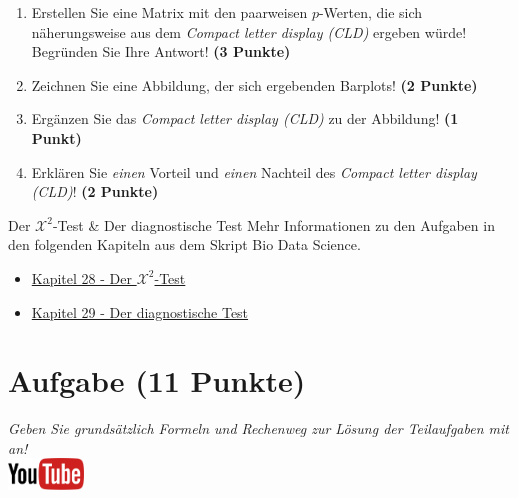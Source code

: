 \documentclass[a4paper, 9pt]{scrartcl}\usepackage[]{graphicx}\usepackage[]{xcolor}
\begin{document}
\begin{enumerate}
\item Erstellen Sie eine Matrix mit den paarweisen $p$-Werten, die sich
  n{\"a}herungsweise aus dem \textit{Compact letter display (CLD)} ergeben w{\"u}rde! Begr{\"u}nden Sie Ihre Antwort! \textbf{(3 Punkte)}
\item Zeichnen Sie eine Abbildung, der sich ergebenden Barplots! \textbf{(2 Punkte)}
\item Erg{\"a}nzen Sie das \textit{Compact letter display (CLD)} zu der
  Abbildung! \textbf{(1 Punkt)}
\item Erkl{\"a}ren Sie \textit{einen} Vorteil und \textit{einen} Nachteil des \textit{Compact letter display (CLD)}! \textbf{(2 Punkte)}
\end{enumerate}

 
\clearpage
  \begin{graybox}{Der $\mathcal{X}^2$-Test \& Der diagnostische Test}
Mehr Informationen zu den Aufgaben in den folgenden Kapiteln aus dem Skript Bio Data Science.
  \begin{itemize}
  \item \href{https://jkruppa.github.io/stat-tests-chi-test.html}{Kapitel 28 - Der $\mathcal{X}^2$-Test}
  \item \href{https://jkruppa.github.io/stat-tests-diagnostic.html}{Kapitel 29 - Der diagnostische Test}
  \end{itemize}
\end{graybox}
\clearpage

\section{Aufgabe \hfill (11 Punkte)}

\textit{Geben Sie grunds{\"a}tzlich Formeln und Rechenweg zur L{\"o}sung der
  Teilaufgaben mit an!} \\[1Ex]

\hfill\href{https://youtu.be/-Kva5wc5Elw}{\includegraphics[width =
  2cm]{img/youtube}}\\[1Ex]
\end{document}
